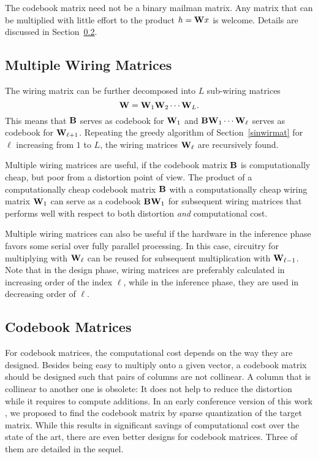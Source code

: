 \documentclass[twocolumn]{IEEEtran}
\begin{document}
The codebook matrix need not be a binary mailman matrix. Any matrix that can be multiplied with little effort to the product $h=\mathbf{W} x$ is welcome. Details are discussed in Section~\ref{codmat}.

\subsection{Multiple Wiring Matrices}

The wiring matrix can be further decomposed into $L$ sub-wiring matrices
\begin{equation}
\mathbf{W} = \mathbf{W}_1 \mathbf{W}_2 \cdots \mathbf{W}_L.
\end{equation}
This means that $\mathbf{B}$ serves as codebook for $\mathbf{W}_1$ and $\mathbf{B}\mathbf{W}_1\cdots \mathbf{W}_\ell$ serves as codebook for $\mathbf{W}_{\ell+1}$. Repeating the greedy algorithm of Section~\ref{sinwirmat} for $\ell$ increasing from $1$ to $L$, the wiring matrices $\mathbf{W}_\ell$ are recursively found.

Multiple wiring matrices are useful, if the codebook matrix $\mathbf{B}$ is computationally cheap, but poor from a distortion point of view. The product of a computationally cheap codebook matrix $\mathbf{B}$ with a computationally cheap wiring matrix $\mathbf{W}_1$ can serve as a codebook $\mathbf{B}\mathbf{W}_1$ for subsequent wiring matrices that performs well with respect to both distortion {\it and} computational cost.

Multiple wiring matrices can also be useful if the hardware in the inference phase favors some serial over fully parallel processing. In this case, circuitry for multiplying with $\mathbf{W}_\ell$ can be reused for subsequent multiplication with $\mathbf{W}_{\ell-1}$. Note that in the design phase, wiring matrices are preferably calculated in increasing order of the index $\ell$, while in the inference phase, they are used in decreasing order of $\ell$.

\subsection{Codebook Matrices}
\label{codmat}

For codebook matrices, the computational cost depends on the way they are designed. Besides being easy to multiply onto a given vector, a codebook matrix should be designed such that pairs of columns are not collinear. A column that is collinear to another one is obsolete: It does not help to reduce the distortion while it requires to compute additions. In an early conference version of this work \cite{mueller:20}, we proposed to find the codebook matrix by sparse quantization of the target matrix.  While this results in significant savings of computational cost over the state of the art, there are even better designs for codebook matrices. Three of them are detailed in the sequel.
\end{document}
